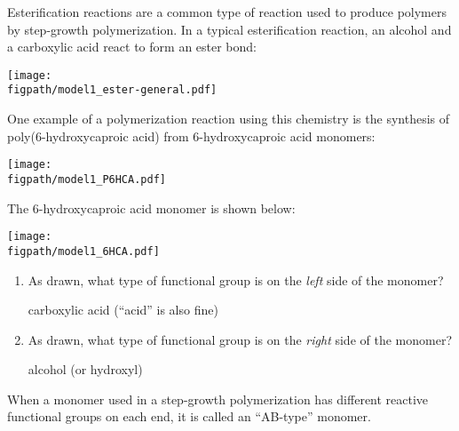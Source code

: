 \begin{activity}
\begin{instructornotes}
\end{instructornotes}


\begin{model}

	Esterification reactions are a common type of reaction used to produce polymers by step-growth polymerization.
	In a typical esterification reaction, an alcohol and a carboxylic acid react to form an ester bond:
	
	\centerline{\texttt{[image: \\figpath/model1\_ester-general.pdf]}}
	
	One example of a polymerization reaction using this chemistry is the synthesis of poly(6-hydroxycaproic acid) from 6-hydroxycaproic acid monomers:
	
	\centerline{\texttt{[image: \\figpath/model1\_P6HCA.pdf]}}

\end{model}


\begin{ctqs}

	\question The 6-hydroxycaproic acid monomer is shown below: \label{ctq:label-6hcpa}
	
	\centerline{\texttt{[image: \\figpath/model1\_6HCA.pdf]}}
	
		\begin{enumerate}
			\item As drawn, what type of functional group is on the \emph{left} side of the monomer?
			
				\begin{solution}[0.5in]
					carboxylic acid (``acid'' is also fine)
				\end{solution}
			
			\item As drawn, what type of functional group is on the \emph{right} side of the monomer?
			
				\begin{solution}[0.5in]
					alcohol (or hydroxyl)
				\end{solution}
		\end{enumerate}
		
\end{ctqs}

\begin{infobox}

	When a monomer used in a step-growth polymerization has different reactive functional groups on each end, it is called an ``AB-type'' monomer.
	

\end{infobox}
\end{activity}
